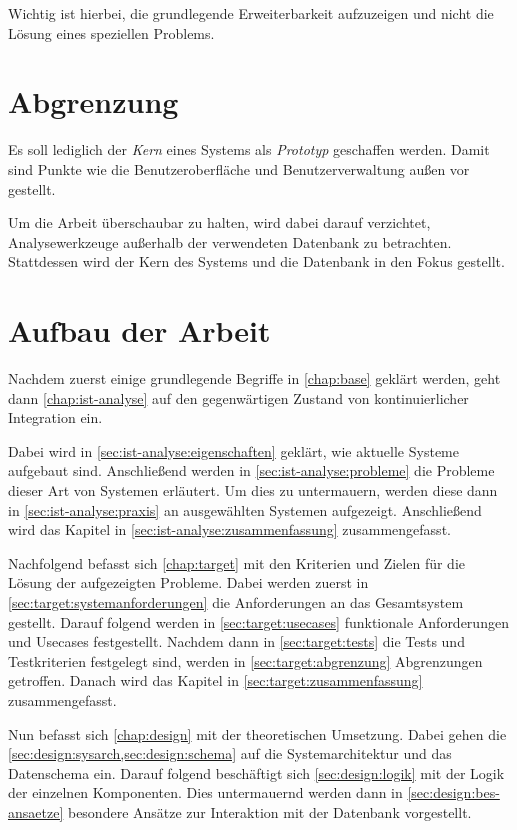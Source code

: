 Wichtig ist hierbei, die grundlegende Erweiterbarkeit aufzuzeigen
und nicht die Lösung eines speziellen Problems.

\section{Abgrenzung}
\label{sec:intro:abgrenzung}

Es soll lediglich der \emph{Kern} eines Systems als \emph{Prototyp} geschaffen werden.
Damit sind Punkte wie die Benutzeroberfläche und Benutzerverwaltung
außen vor gestellt.

Um die Arbeit überschaubar zu halten, wird dabei darauf verzichtet, Analysewerkzeuge außerhalb der verwendeten Datenbank zu betrachten.
Stattdessen wird der Kern des Systems und die Datenbank in den Fokus gestellt.


\section{Aufbau der Arbeit}
\label{sec:intro:aufbau}

Nachdem zuerst einige grundlegende Begriffe in \cref{chap:base} geklärt werden, geht dann \cref{chap:ist-analyse} auf den gegenwärtigen Zustand von kontinuierlicher Integration ein.

Dabei wird in \cref{sec:ist-analyse:eigenschaften} geklärt, wie aktuelle Systeme aufgebaut sind. Anschließend werden in \cref{sec:ist-analyse:probleme} die Probleme dieser Art von Systemen erläutert. Um dies zu untermauern, werden diese dann in \cref{sec:ist-analyse:praxis} an ausgewählten Systemen aufgezeigt.
Anschließend wird das Kapitel in \cref{sec:ist-analyse:zusammenfassung} zusammengefasst.

Nachfolgend befasst sich \cref{chap:target} mit den Kriterien und Zielen für die Lösung der aufgezeigten Probleme. Dabei werden zuerst in \cref{sec:target:systemanforderungen} die Anforderungen an das Gesamtsystem gestellt. Darauf folgend werden in \cref{sec:target:usecases} funktionale Anforderungen und Usecases festgestellt. Nachdem dann in \cref{sec:target:tests} die Tests und Testkriterien festgelegt sind, werden in \cref{sec:target:abgrenzung} Abgrenzungen getroffen. Danach wird das Kapitel in \cref{sec:target:zusammenfassung} zusammengefasst.

Nun befasst sich \cref{chap:design} mit der theoretischen Umsetzung.
Dabei gehen die \cref{sec:design:sysarch,sec:design:schema} auf die Systemarchitektur und das Datenschema ein. Darauf folgend beschäftigt sich \cref{sec:design:logik} mit der Logik der einzelnen Komponenten. Dies untermauernd werden dann in \cref{sec:design:bes-ansaetze} besondere Ansätze zur Interaktion mit der Datenbank vorgestellt.


